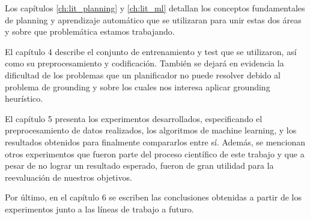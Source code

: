 Los capítulos \ref{ch:lit_planning} y \ref{ch:lit_ml} detallan los conceptos
fundamentales de planning y aprendizaje automático que se utilizaran para unir
estas dos áreas y sobre que problemática estamos trabajando.

El capítulo 4 describe el conjunto de entrenamiento y test que se utilizaron,
así como su preprocesamiento y codificación. También se dejará en evidencia la
dificultad de los problemas que un planificador no puede resolver debido al
problema de grounding y sobre los cuales nos interesa aplicar grounding
heurístico.

El capítulo 5 presenta los experimentos desarrollados, especificando el
preprocesamiento de datos realizados, los algoritmos de machine learning, y los
resultados obtenidos para finalmente compararlos entre sí. Además, se mencionan
otros experimentos que fueron parte del proceso científico de este trabajo y que
a pesar de no lograr un resultado esperado, fueron de gran utilidad para la
reevaluación de nuestros objetivos.

Por último, en el capítulo 6 se escriben las conclusiones obtenidas a partir de
los experimentos junto a las líneas de trabajo a futuro.